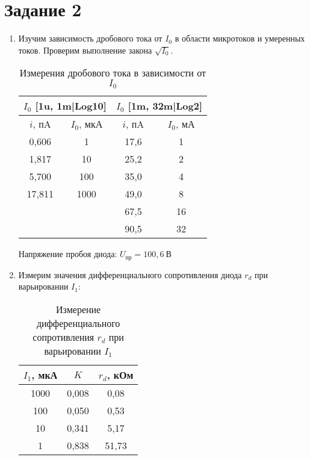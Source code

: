 \section*{Задание 2}
\begin{enumerate}
	\item Изучим зависимость дробового тока от $ I_0 $ в области микротоков и умеренных токов. Проверим выполнение закона $ \sqrt{I_0} $.
	
	\begin{table}[!h]
		\centering
		\begin{tabular}{|cc|cc|}
			\hline
			\multicolumn{2}{|c|}{$ I_0 $ {[}1u,   1m|Log10{]}} & \multicolumn{2}{c|}{$ I_0 $ {[}1m, 32m|Log2{]}} \\ \hline
			\multicolumn{1}{|c|}{$ i $, пA}     & $ I_0 $, мкА    & \multicolumn{1}{c|}{$ i $, пA}    & $ I_0 $, мА    \\ \hline
			\multicolumn{1}{|c|}{0,606}     & 1            & \multicolumn{1}{c|}{17,6}     & 1           \\ \hline
			\multicolumn{1}{|c|}{1,817}     & 10           & \multicolumn{1}{c|}{25,2}     & 2           \\ \hline
			\multicolumn{1}{|c|}{5,700}     & 100          & \multicolumn{1}{c|}{35,0}     & 4           \\ \hline
			\multicolumn{1}{|c|}{17,811}    & 1000         & \multicolumn{1}{c|}{49,0}     & 8           \\ \hline
			&              & \multicolumn{1}{c|}{67,5}     & 16          \\ \cline{3-4} 
			&              & \multicolumn{1}{c|}{90,5}     & 32          \\ \hline
		\end{tabular}
		\caption{Измерения дробового тока в зависимости от $ I_0 $}
		\label{tab:table_4}
	\end{table}
	Напряжение пробоя диода: $ \boxed{U_{пр} = 100,6 \ В} $

	\item Измерим значения дифференциального сопротивления диода $ r_d $  при варьировании $ I_1 $: 
	
	\begin{table}[!h]
		\centering
		\begin{tabular}{|c|c|c|}
			\hline
			$ I_1 $, мкА & $ K $    & $ r_d $, кОм \\ \hline
			1000      & 0,008 & 0,08        \\ \hline
			100       & 0,050 & 0,53        \\ \hline
			10        & 0,341 & 5,17        \\ \hline
			1         & 0,838 & 51,73        \\ \hline
		\end{tabular}
	\caption{Измерение дифференциального сопротивления $ r_d $ при варьировании $ I_1 $ }
	\label{tab:table_5}
	\end{table}


\end{enumerate}
